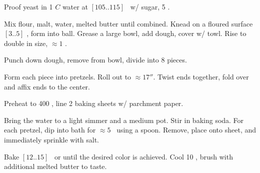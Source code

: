 \begin{preparation}
\item Proof yeast in 1 $C$ water at $[105..115]$ \Fahrenheit~w/ sugar, 5 \minute.

\item Mix flour, malt, water, melted butter until combined.
	Knead on a floured surface $[3..5]$ \minute, form into ball.
	Grease a large bowl, add dough, cover w/ towl.
	Rise to double in size, $\approx 1$ \hour.

\item Punch down dough, remove from bowl, divide into 8 pieces.

\item Form each piece into pretzels.
	Roll out to $\approx 17''$.
	Twist ends together, fold over and affix ends to the center.

\item Preheat to 400 \Fahrenheit, line 2 baking sheets w/ parchment paper.

\item Bring the water to a light simmer and a medium pot.
	Stir in baking soda.
	For each pretzel, dip into bath for $\approx 5$ \second~using a spoon.
	Remove, place onto sheet, and immediately sprinkle with salt.

\item Bake $[12..15]$ \minute~or until the desired color is achieved.
	Cool 10 \minute, brush with additional melted butter to taste.
\end{preparation}

\recipeend%
